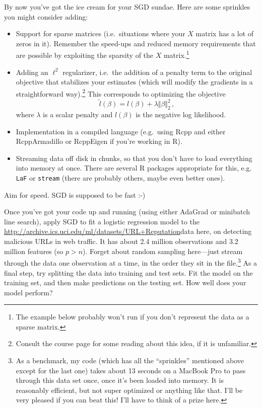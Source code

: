 \documentclass{article}
\begin{document}
By now you've got the ice cream for your SGD sundae.  Here are some sprinkles you might consider adding:
\begin{itemize}
\item Support for sparse matrices (i.e.~situations where your $X$ matrix has a lot of zeros in it).  Remember the speed-ups and reduced memory requirements that are possible by exploiting the sparsity of the $X$ matrix.\footnote{The example below probably won't run if you don't represent the data as a sparse matrix. }
\item Adding an $\ell^2$ regularizer, i.e.~the addition of a penalty term to the original objective that stabilizes your estimates (which will modify the gradients in a straightforward way).\footnote{Consult the course page for some reading about this idea, if it is unfamiliar.}  This corresponds to optimizing the objective
$$
\tilde{l}(\beta) = l(\beta) + \lambda \Vert \beta \Vert_2^2 \, ,
$$
where $\lambda$ is a scalar penalty and $l(\beta)$ is the negative log likelihood.
\item Implementation in a compiled language (e.g.~using Rcpp and either RcppArmadillo or RcppEigen if you're working in R).
\item Streaming data off disk in chunks, so that you don't have to load everything into memory at once.  There are several R packages appropriate for this, e.g. \verb|LaF| or \verb|stream| (there are probably others, maybe even better ones).
\end{itemize}

Aim for speed.  SGD is supposed to be fast :-)

Once you've got your code up and running (using either AdaGrad or minibatch line search), apply SGD to fit a logistic regression model to the \url{http://archive.ics.uci.edu/ml/datasets/URL+Reputation}{data here}, on detecting malicious URLs in web traffic.  It has about 2.4 million observations and 3.2 million features (so $p > n$).   Forget about random sampling here---just stream through the data one observation at a time, in the order they sit in the file.\footnote{As a benchmark, my code (which has all the ``sprinkles'' mentioned above except for the last one) takes about 13 seconds on a MacBook Pro to pass through this data set once, once it's been loaded into memory.  It is reasonably efficient, but not super optimized or anything like that.   I'll be very pleased if you can beat this!  I'll have to think of a prize here.}  As a final step, try splitting the data into training and test sets.  Fit the model on the training set, and then make predictions on the testing set.  How well does your model perform?
\end{document}
